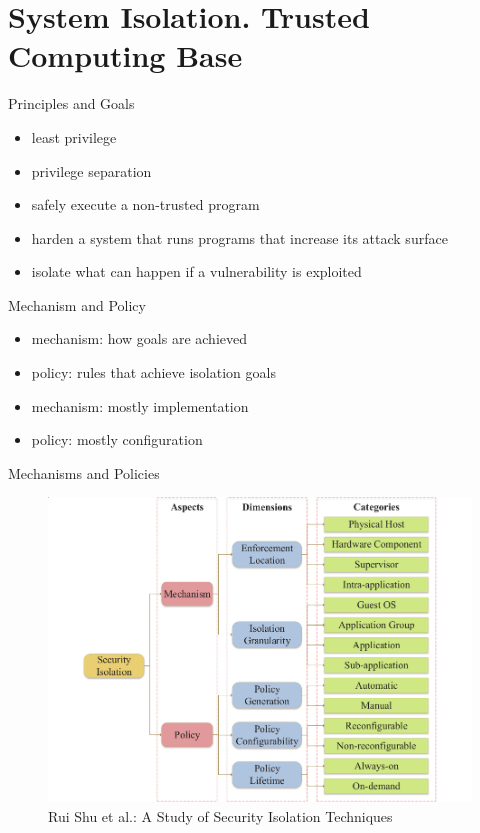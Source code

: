 \documentclass{curs}
\begin{document}
\section{System Isolation. Trusted Computing Base}

\begin{frame}{Principles and Goals}
  \begin{itemize}
    \item least privilege
    \item privilege separation
    \item safely execute a non-trusted program
    \item harden a system that runs programs that increase its attack surface
    \item isolate what can happen if a vulnerability is exploited
  \end{itemize}
\end{frame}

\begin{frame}{Mechanism and Policy}
  \begin{itemize}
    \item mechanism: how goals are achieved
    \item policy: rules that achieve isolation goals
    \item mechanism: mostly implementation
    \item policy: mostly configuration
  \end{itemize}
\end{frame}

\begin{frame}{Mechanisms and Policies}
  \begin{figure}
    \centering
    \includegraphics[width=\textwidth]{img/isolation-mechanism-policy} \\
    {\tiny Rui Shu et al.: A Study of Security Isolation Techniques}
  \end{figure}
\end{frame}
\end{document}
